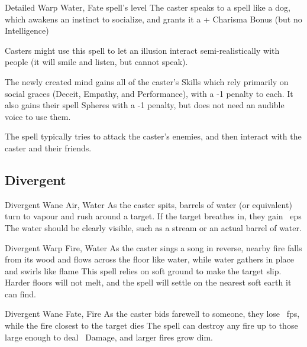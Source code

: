 \begin{multicols}{2}



  {Detailed}%
  {Warp}%
  {Water, Fate}%
  {spell's level}%
  {The caster speaks to a spell like a dog, which awakens an instinct to socialize, and grants it a + Charisma Bonus (but no Intelligence)}%
  {
  Casters might use this spell to let an illusion interact semi-realistically with people (it will smile and listen, but cannot speak).

  The newly created mind gains all of the caster's Skills which rely primarily on social graces (Deceit, Empathy, and Performance), with a -1 penalty to each.
  It also gains their spell Spheres with a -1 penalty, but does not need an audible voice to use them.

  The spell typically tries to attack the caster's enemies, and then interact with the caster and their friends.

  }

\subsection{Divergent}

  {Divergent}%
  {Wane}%
  {Air, Water}%
  {}%
  {As the caster spits,  barrels of water (or equivalent) turn to vapour and rush around a target.
  If the target breathes in, they gain ~\glspl{ep}}%
  {
    The water should be clearly visible, such as a stream or an actual barrel of water.}

  {Divergent}%
  {Warp}%
  {Fire, Water}%
  {}%
  {As the caster sings a song in reverse, nearby fire falls from its wood and flows across the floor like water, while water gathers in place and swirls like flame}%
  {
  This spell relies on soft ground to make the target slip.
  Harder floors will not melt, and the spell will settle on the nearest soft earth it can find.}

  {Divergent}%
  {Wane}%
  {Fate, Fire}%
  {}%
  {As the caster bids farewell to someone, they lose \showDam~\glspl{fp}, while the fire closest to the target dies}%
  {
  The spell can destroy any fire up to those large enough to deal \showDam\ Damage, and larger fires grow dim.}


\end{multicols}
